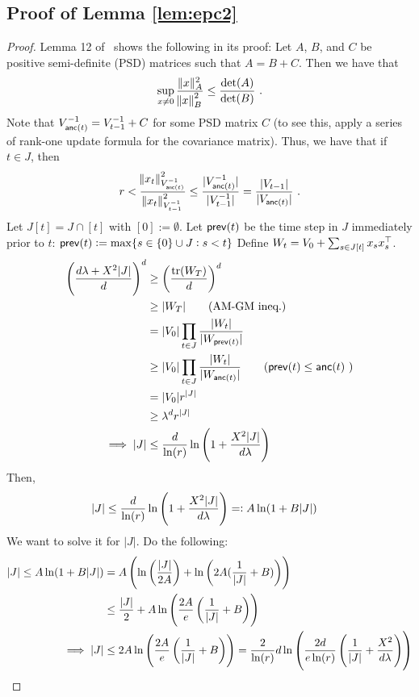 
\subsection{Proof of Lemma \ref{lem:epc2}}
\begin{proof}
  Lemma 12 of~\citet{ay11improved} shows the following in its proof: Let $A$, $B$, and $C$ be positive semi-definite (PSD) matrices such that $A = B + C$. Then we have that 
  \begin{align*}
    \sup_{x\neq 0 }{ \frac{\|x\|^2_{A} }{\norm{x}^2_B} }  \le { \frac{\ensuremath{\mbox{det}}(A)}{\ensuremath{\mbox{det}}(B)} } ~.
  \end{align*}
  Note that $V^{-1}_{\operatorname{\mathsf{anc}}(t)} = V^{-1}_{t-1} + C$ for some PSD matrix $C$ (to see this, apply a series of rank-one update formula for the covariance matrix).
  Thus, we have that if $t \in J$, then
  \begin{align*}
    r < { \frac{\norm{x_t}^2_{V_{\operatorname{\mathsf{anc}}(t)}^{-1}}}{\norm{x_t}^{2}_{V_{t-1}^{-1}} } }  
    \le { \frac{|V^{-1}_{\operatorname{\mathsf{anc}}(t)}|}{|V_{t-1}^{-1}|} } 
    =   { \frac{|V_{t-1}|}{|V_{\operatorname{\mathsf{anc}}(t)}|} }  ~.
  \end{align*}
  Let ${J[t]} = J \cap [t]$ with $[0] := \emptyset$.
  Let $\operatorname{\mathsf{prev}}(t)$ be the time step in $J$ immediately prior to $t$: $\operatorname{\mathsf{prev}}(t) := \max\{s\in \{0\} \cup J: s < t\}$ 
  Define ${W_t} = V_0 + \sum_{s\in J[t]} x_s x_s^{\top}$.
  \begin{align*}
    \del{\fr{d\lam + X^2|J|}{d} }^d
    &\ge \del{\fr{\tr(W_T)}{d} }^d
    \\&\ge |W_T| \tag{AM-GM ineq.}
    \\&= |V_0| \prod_{t\in J} \fr{|W_t|}{|W_{\mathsf{prev}(t)}|} 
    \\&\ge |V_0| \prod_{t\in J} \fr{|W_t|}{|W_{\anc(t)}|}  \tag{$ \mathsf{prev}(t) \le \anc(t)$ }
    \\&= |V_0| r^{|J|}
    \\&\ge \lam^d r^{|J|}
    \\  \implies 
    |J| &\le \fr{d}{\ln(r)}\ln\del{1+\fr{X^2|J|}{d\lam} } 
  \end{align*}
  Then, 
  \begin{align} \label{eq:20210425-0} 
    |J| &\le \fr{d}{\ln(r)}\ln\del{1+\fr{X^2|J|}{d\lam} } =: {A} \ln (1 + {B} |J|)
  \end{align}
  We want to solve it for $|J|$.
  Do the following:
  \begin{align}
    |J| 
    \le A \ln(1 + B |J|) 
    &= A\del{\ln\del{\fr{|J|}{2A} } + \ln\del{2A(\fr{1}{|J|} + B) } } 
    \\&\le \fr{|J|}{2} + A \ln\del{\fr{2A}{e} \del{\fr{1}{|J|} + B } } 
    \\  \implies |J| &\le 2A \ln\del{\fr{2A}{e} \del{\fr{1}{|J|} + B } }  =  \fr{2}{\ln(r)} d \ln\del{\fr{2d}{e\ln(r)}\del{\fr 1 {|J|}  + \frac {X^2} {d\lam}}  }  \label{eq:20210425-3}
  \end{align}
  

\end{proof}
